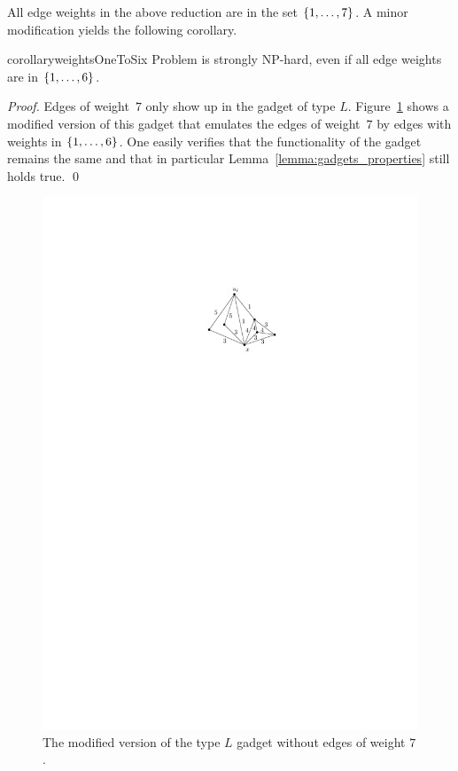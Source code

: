 All edge weights in the above reduction are in the set $\{ 1, \ldots, 7 \}$.
A minor modification yields the following corollary.
\begin{restatable}{corollary}{weightsOneToSix}
\label{coro:small-weights}
Problem {\xxxNTP} is strongly NP-hard, even if all edge weights are in $\{ 1, \ldots, 6 \}$.
\end{restatable}
\begin{proof}
Edges of weight~$7$ only show up in the gadget of type $L$.
Figure~\ref{fig_hamilton_cycle_improved} shows a modified version of this gadget that emulates 
the edges of weight~$7$ by edges with weights in $\{ 1, \ldots, 6 \}$.
One easily verifies that the functionality of the gadget remains the same and that in particular
Lemma~\ref{lemma:gadgets_properties} still holds true.
\qed
\end{proof}
\begin{figure}[htpb]
\centering
\includegraphics[scale=1.1]{chapter-6-NTP/act-hamilton-cycle-b}
\caption{The modified version of the type $L$ gadget without edges of weight $7$.}
\label{fig_hamilton_cycle_improved}
\end{figure}


